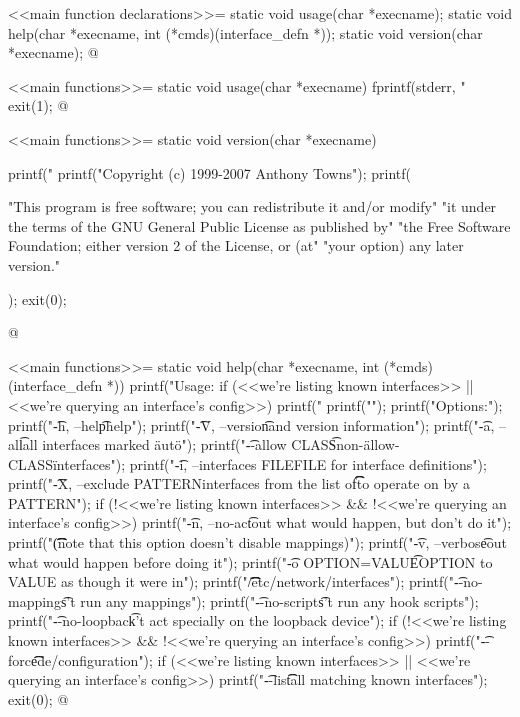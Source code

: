 \documentclass{article}
\begin{document}
<<main function declarations>>=
static void usage(char *execname);
static void help(char *execname, int (*cmds)(interface_defn *));
static void version(char *execname);
@ 

<<main functions>>=
static void usage(char *execname) {
	fprintf(stderr, "%
	exit(1);
}
@ 

<<main functions>>=
static void version(char *execname) {
	printf("%
	printf("Copyright (c) 1999-2007 Anthony Towns\n\n");
	printf(

"This program is free software; you can redistribute it and/or modify\n"
"it under the terms of the GNU General Public License as published by\n"
"the Free Software Foundation; either version 2 of the License, or (at\n"
"your option) any later version.\n"

	);
	exit(0);
}
@ 

<<main functions>>=
static void help(char *execname, int (*cmds)(interface_defn *)) {
	printf("Usage: %
	if (<<we're listing known interfaces>>
	    || <<we're querying an interface's config>>)
		printf("       %
	printf("\n");
	printf("Options:\n");
	printf("\t-h, --help\t\tthis help\n");
	printf("\t-V, --version\t\tcopyright and version information\n");
	printf("\t-a, --all\t\tprocess all interfaces marked \"auto\"\n");
	printf("\t--allow CLASS\t\tignore non-\"allow-CLASS\" interfaces\n");
	printf("\t-i, --interfaces FILE\tuse FILE for interface definitions\n");
	printf("\t-X, --exclude PATTERN\texclude interfaces from the list of\n\t\t\t\tinterfaces to operate on by a PATTERN\n");
	if (!<<we're listing known interfaces>>
	    && !<<we're querying an interface's config>>)
		printf("\t-n, --no-act\t\tprint out what would happen, but don't do it\n");
	printf("\t\t\t\t(note that this option doesn't disable mappings)\n");
	printf("\t-v, --verbose\t\tprint out what would happen before doing it\n");
	printf("\t-o OPTION=VALUE\t\tset OPTION to VALUE as though it were in\n");
	printf("\t\t\t\t/etc/network/interfaces\n");
	printf("\t--no-mappings\t\tdon't run any mappings\n");
	printf("\t--no-scripts\t\tdon't run any hook scripts\n");
	printf("\t--no-loopback\t\tdon't act specially on the loopback device\n");
	if (!<<we're listing known interfaces>>
	    && !<<we're querying an interface's config>>)
		printf("\t--force\t\t\tforce de/configuration\n");
	if (<<we're listing known interfaces>>
	    || <<we're querying an interface's config>>)
		printf("\t--list\t\t\tlist all matching known interfaces\n");
	exit(0);
}
@ 
\end{document}
